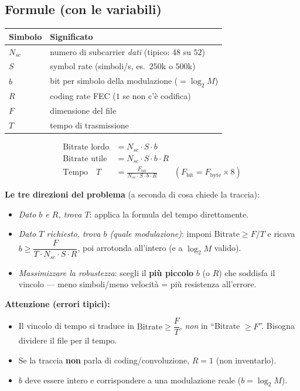 \documentclass[11pt,a4paper]{report}
\begin{document}
\subsection*{Formule (con le variabili)}

\begin{center}\footnotesize
{}\begin{tabular}{ll}
\textbf{Simbolo} & \textbf{Significato} \\\hline
$N_{sc}$ & numero di subcarrier \emph{dati} (tipico: $48$ su $52$) \\
$S$ & symbol rate (simboli/s, es.\ $250$k o $500$k) \\
$b$ & bit per simbolo della modulazione ($=\log_2 M$) \\
$R$ & coding rate FEC ($1$ se non c'è codifica) \\
$F$ & dimensione del file \\
$T$ & tempo di trasmissione \\
\end{tabular}
\end{center}

\begin{align*}
\text{Bitrate lordo} &= N_{sc}\cdot S\cdot b \\
\text{Bitrate utile} &= N_{sc}\cdot S\cdot b\cdot R \\
\text{Tempo} \quad T &= \frac{F_{\text{bit}}}{N_{sc}\cdot S\cdot b\cdot R}
\qquad (F_{\text{bit}} = F_{\text{byte}}\times 8)
\end{align*}

\textbf{Le tre direzioni del problema} (a seconda di cosa chiede la traccia):
\begin{itemize}[noitemsep]
\item \emph{Dato $b$ e $R$, trova $T$}: applica la formula del tempo direttamente.
\item \emph{Dato $T$ richiesto, trova $b$ (quale modulazione)}: imponi
$\text{Bitrate} \ge F/T$ e ricava $b \ge \dfrac{F}{T\cdot N_{sc}\cdot S\cdot R}$,
poi arrotonda all'intero (e a $\log_2 M$ valido).
\item \emph{Massimizzare la robustezza}: scegli il \textbf{più piccolo} $b$ (o $R$)
che soddisfa il vincolo --- meno simboli/meno velocità = più resistenza all'errore.
\end{itemize}

\textbf{Attenzione (errori tipici):}
\begin{itemize}[noitemsep]
\item Il vincolo di tempo si traduce in $\text{Bitrate}\ge \dfrac{F}{T}$, \emph{non}
in ``Bitrate $\ge F$''. Bisogna dividere il file per il tempo.
\item Se la traccia \textbf{non} parla di coding/convoluzione, $R=1$ (non inventarlo).
\item $b$ deve essere intero e corrispondere a una modulazione reale ($b=\log_2 M$).
\end{itemize}
\end{document}
